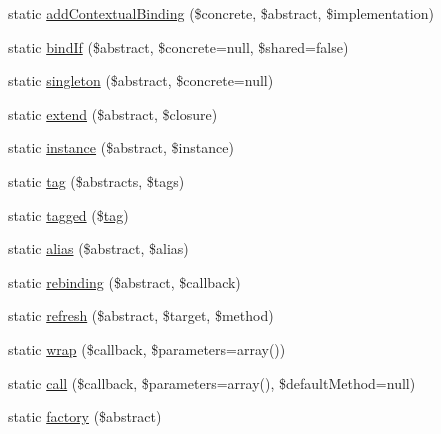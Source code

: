 \begin{DoxyCompactItemize}
\item 
static \mbox{\hyperlink{class_illuminate_1_1_support_1_1_facades_1_1_app_ae0afa82b6a8d53c806ae365e7626bd07}{add\+Contextual\+Binding}} (\$concrete, \$abstract, \$implementation)
\item 
static \mbox{\hyperlink{class_illuminate_1_1_support_1_1_facades_1_1_app_a8db40bfe0c2b3a1c4ede6815ce71abc5}{bind\+If}} (\$abstract, \$concrete=null, \$shared=false)
\item 
static \mbox{\hyperlink{class_illuminate_1_1_support_1_1_facades_1_1_app_a893f2164a679be5778ef2f61e66ce483}{singleton}} (\$abstract, \$concrete=null)
\item 
static \mbox{\hyperlink{class_illuminate_1_1_support_1_1_facades_1_1_app_afc2cde60d0741918d47b74fb55240f2a}{extend}} (\$abstract, \$closure)
\item 
static \mbox{\hyperlink{class_illuminate_1_1_support_1_1_facades_1_1_app_aec0719063c5b42f03d9755ca1cddb4a5}{instance}} (\$abstract, \$instance)
\item 
static \mbox{\hyperlink{class_illuminate_1_1_support_1_1_facades_1_1_app_a7e64d002f0ed1005ecda67ca49ef254d}{tag}} (\$abstracts, \$tags)
\item 
static \mbox{\hyperlink{class_illuminate_1_1_support_1_1_facades_1_1_app_a82a57ed32c484ce85898ea2f88ac382f}{tagged}} (\$\mbox{\hyperlink{class_illuminate_1_1_support_1_1_facades_1_1_app_a7e64d002f0ed1005ecda67ca49ef254d}{tag}})
\item 
static \mbox{\hyperlink{class_illuminate_1_1_support_1_1_facades_1_1_app_a1b1fecb6264e98b03b1216e0e8976649}{alias}} (\$abstract, \$alias)
\item 
static \mbox{\hyperlink{class_illuminate_1_1_support_1_1_facades_1_1_app_a339861dbb69a8272f82ea394089c98c1}{rebinding}} (\$abstract, \$callback)
\item 
static \mbox{\hyperlink{class_illuminate_1_1_support_1_1_facades_1_1_app_a778ca58f7e376f07cbc7718aa03bd681}{refresh}} (\$abstract, \$target, \$method)
\item 
static \mbox{\hyperlink{class_illuminate_1_1_support_1_1_facades_1_1_app_a02a59d234efa1d1ca364e08584a14d34}{wrap}} (\$callback, \$parameters=array())
\item 
static \mbox{\hyperlink{class_illuminate_1_1_support_1_1_facades_1_1_app_abdb4bfe6bdc04b28d4adb6572d976fd9}{call}} (\$callback, \$parameters=array(), \$default\+Method=null)
\item 
static \mbox{\hyperlink{class_illuminate_1_1_support_1_1_facades_1_1_app_a367f484711c4a6b30fa94b18f6c7a87a}{factory}} (\$abstract)

\end{DoxyCompactItemize}
